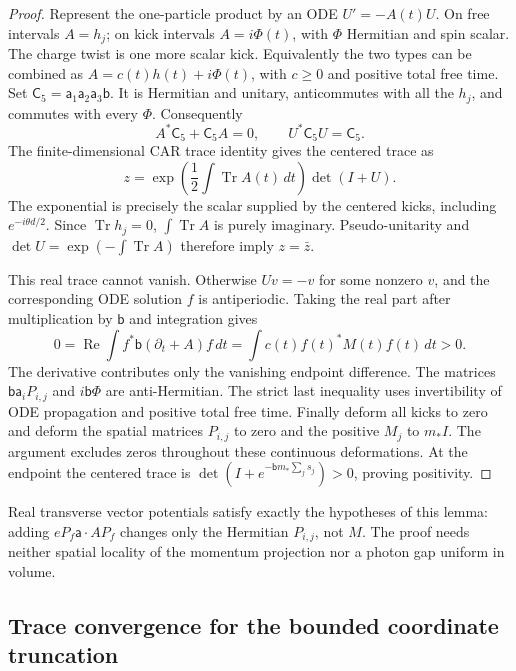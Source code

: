 \begin{proof}
Represent the one-particle product by an ODE
\(U'=-A(t)U\). On free intervals \(A=h_j\); on kick intervals
\(A=i\Phi(t)\), with \(\Phi\) Hermitian and spin scalar.
The charge twist is one more scalar kick. Equivalently the two types
can be combined as \(A=c(t)h(t)+i\Phi(t)\), with \(c\ge0\) and
positive total free time. Set
\(\mathsf C_5=\mathsf a_1\mathsf a_2\mathsf a_3\mathsf b\).
It is Hermitian and unitary, anticommutes with all the \(h_j\), and
commutes with every \(\Phi\). Consequently
\[
A^*\mathsf C_5+\mathsf C_5A=0,
\qquad U^*\mathsf C_5U=\mathsf C_5.
\]
The finite-dimensional CAR trace identity gives the centered trace as
\[
z=\exp\left(\frac12\int\operatorname{Tr}A(t)\,dt\right)
       \det(I+U).
\]
The exponential is precisely the scalar supplied by the centered kicks,
including \(e^{-i\theta d/2}\). Since \(\operatorname{Tr}h_j=0\),
\(\int\operatorname{Tr}A\) is purely imaginary. Pseudo-unitarity and
\(\det U=\exp(-\int\operatorname{Tr}A)\) therefore imply \(z=\bar z\).

This real trace cannot vanish. Otherwise \(Uv=-v\) for some nonzero
\(v\), and the corresponding ODE solution \(f\) is antiperiodic.
Taking the real part after multiplication by \(\mathsf b\) and
integration gives
\[
0=\operatorname{Re}\int f^*\mathsf b(\partial_t+A)f\,dt
  =\int c(t)f(t)^*M(t)f(t)\,dt>0.
\]
The derivative contributes only the vanishing endpoint difference.
The matrices \(\mathsf b\mathsf a_iP_{i,j}\) and
\(i\mathsf b\Phi\) are anti-Hermitian. The strict last inequality
uses invertibility of ODE propagation and positive total free time.
Finally deform all kicks to zero and deform the spatial matrices
\(P_{i,j}\) to zero and the positive \(M_j\) to \(m_*I\). The
argument excludes zeros throughout these continuous deformations.
At the endpoint the centered trace is
\(\det(I+e^{-\mathsf b m_*\sum_js_j})>0\), proving positivity.
\end{proof}

Real transverse vector potentials satisfy exactly the hypotheses of
this lemma: adding \(eP_f\boldsymbol{\mathsf a}\cdot A P_f\)
changes only the Hermitian \(P_{i,j}\), not \(M\). The proof needs
neither spatial locality of the momentum projection nor a photon gap
uniform in volume.

\subsection{Trace convergence for the bounded coordinate truncation}

